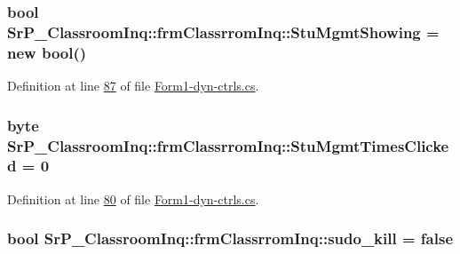 \hypertarget{class_sr_p___classroom_inq_1_1frm_classrrom_inq_a6a40312dc72ead57d8d40d415ee14a07}{
\subsubsection[{\-Stu\-Mgmt\-Showing}]{\setlength{\rightskip}{0pt plus 5cm}bool {\bf \-Sr\-P\-\_\-\-Classroom\-Inq\-::frm\-Classrrom\-Inq\-::\-Stu\-Mgmt\-Showing} = new bool()}}
\label{class_sr_p___classroom_inq_1_1frm_classrrom_inq_a6a40312dc72ead57d8d40d415ee14a07}


\-Definition at line \hyperlink{_form1-dyn-ctrls_8cs_source_l00087}{87} of file \hyperlink{_form1-dyn-ctrls_8cs_source}{\-Form1-\/dyn-\/ctrls.\-cs}.

\hypertarget{class_sr_p___classroom_inq_1_1frm_classrrom_inq_a8746b34d859922daf9b2d5b00cef317e}{
\subsubsection[{\-Stu\-Mgmt\-Times\-Clicked}]{\setlength{\rightskip}{0pt plus 5cm}byte {\bf \-Sr\-P\-\_\-\-Classroom\-Inq\-::frm\-Classrrom\-Inq\-::\-Stu\-Mgmt\-Times\-Clicked} = 0}}
\label{class_sr_p___classroom_inq_1_1frm_classrrom_inq_a8746b34d859922daf9b2d5b00cef317e}


\-Definition at line \hyperlink{_form1-dyn-ctrls_8cs_source_l00080}{80} of file \hyperlink{_form1-dyn-ctrls_8cs_source}{\-Form1-\/dyn-\/ctrls.\-cs}.

\hypertarget{class_sr_p___classroom_inq_1_1frm_classrrom_inq_a3ac2217a30904b65be786ee00a312fea}{
\subsubsection[{sudo\-\_\-kill}]{\setlength{\rightskip}{0pt plus 5cm}bool {\bf \-Sr\-P\-\_\-\-Classroom\-Inq\-::frm\-Classrrom\-Inq\-::sudo\-\_\-kill} = false}}
\label{class_sr_p___classroom_inq_1_1frm_classrrom_inq_a3ac2217a30904b65be786ee00a312fea}


